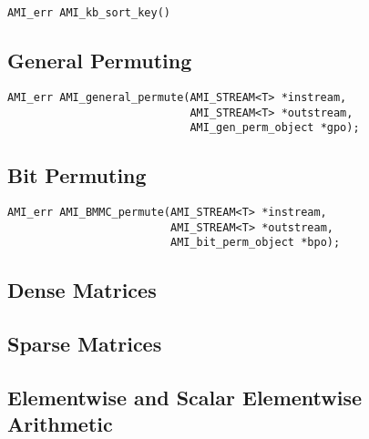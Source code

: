 \begin{verbatim}
AMI_err AMI_kb_sort_key()
\end{verbatim}


\subsection{General Permuting}
\label{sec:ref-ami-gp}


\tobeextended

\begin{verbatim}
AMI_err AMI_general_permute(AMI_STREAM<T> *instream, 
                            AMI_STREAM<T> *outstream, 
                            AMI_gen_perm_object *gpo);
\end{verbatim}

\subsection{Bit Permuting}
\label{sec:ref-ami-bp}


\tobeextended

\begin{verbatim}
AMI_err AMI_BMMC_permute(AMI_STREAM<T> *instream, 
                         AMI_STREAM<T> *outstream, 
                         AMI_bit_perm_object *bpo);
\end{verbatim}

\subsection{Dense Matrices}
\label{sec:ref-ami-matrix}


\tobewritten


\subsection{Sparse Matrices}
\label{sec:ref-ami-sm}


\tobewritten

\subsection{Elementwise and Scalar Elementwise Arithmetic}
\label{sec:ref-ami-arith}

